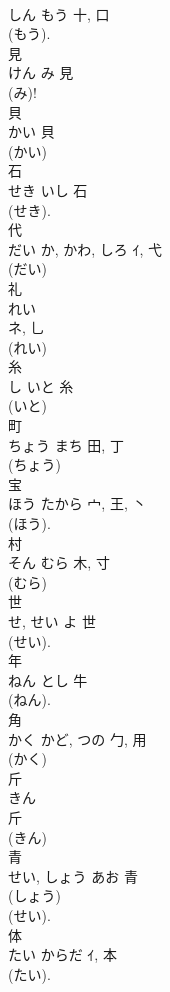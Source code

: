 \documentclass[8pt]{extreport}
\begin{document}
\begin{CJK}{UTF8}{min}
\\	しん	もう	十, 口	
\\	(もう).	
\\	見	
\\	けん	み	見	
\\	(み)!
\\	貝	
\\	かい	貝	
\\	(かい) 
\\	石	
\\	せき	いし	石	
\\	(せき).	
\\	代	
\\	だい	か, かわ, しろ	ｲ, 弋	
\\	(だい) 
\\	礼	
\\	れい	
\\	ネ, 乚	
\\	(れい) 
\\	糸	
\\	し	いと	糸	
\\	(いと) 
\\	町	
\\	ちょう	まち	田, 丁	
\\	(ちょう) 
\\	宝	
\\	ほう	たから	宀, 王, 丶	
\\	(ほう). 
\\	村	
\\	そん	むら	木, 寸	
\\	(むら) 
\\	世	
\\	せ, せい	よ	世	
\\	(せい). 
\\	年	
\\	ねん	とし	牛		
\\	(ねん). 
\\	角	
\\	かく	かど, つの	勹, 用	
\\	(かく) 
\\	斤	
\\	きん	
\\	斤	
\\	(きん) 
\\	青	
\\	せい, しょう	あお	青	
\\	(しょう) 
\\	(せい). 
\\	体	
\\	たい	からだ	ｲ, 本	
\\	(たい). 

\end{CJK}
\end{document}
